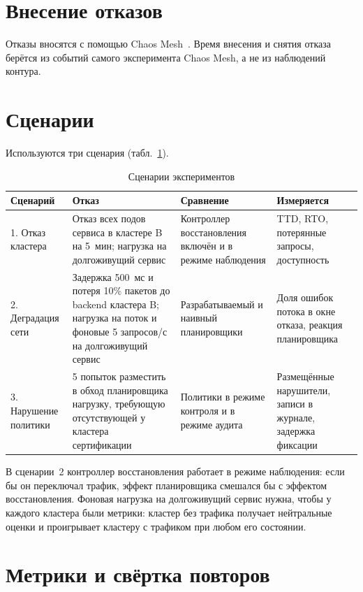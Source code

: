 \section{Внесение отказов}

Отказы вносятся с помощью Chaos Mesh~\cite{chaos-mesh}. Время внесения и
снятия отказа берётся из событий самого эксперимента Chaos Mesh, а не из
наблюдений контура.

\section{Сценарии}

Используются три сценария (табл.~\ref{tab:scenarios}).

\begin{table}[ht]
  \centering
  \caption{Сценарии экспериментов}
  \label{tab:scenarios}
  \small
  \begin{tabularx}{\textwidth}{@{}p{}XXX@{}}
    \toprule
    Сценарий & Отказ & Сравнение & Измеряется \\
    \midrule
    1. Отказ кластера & Отказ всех подов сервиса в кластере B на 5~мин;
      нагрузка на долгоживущий сервис & Контроллер восстановления
      включён и в режиме наблюдения & TTD, RTO, потерянные запросы,
      доступность \\
    2. Деградация сети & Задержка 500~мс и потеря 10\% пакетов до backend
      кластера B; нагрузка на поток и фоновые 5 запросов/с на
      долгоживущий сервис & Разрабатываемый и наивный планировщики &
      Доля ошибок потока в окне отказа, реакция планировщика \\
    3. Нарушение политики & 5 попыток разместить в обход планировщика
      нагрузку, требующую отсутствующей у кластера сертификации &
      Политики в режиме контроля и в режиме аудита & Размещённые
      нарушители, записи в журнале, задержка фиксации \\
    \bottomrule
  \end{tabularx}
\end{table}

В сценарии~2 контроллер восстановления работает в режиме наблюдения: если бы
он переключал трафик, эффект планировщика смешался бы с эффектом
восстановления. Фоновая нагрузка на долгоживущий сервис нужна, чтобы у
каждого кластера были метрики: кластер без трафика получает нейтральные
оценки и проигрывает кластеру с трафиком при любом его состоянии.

\section{Метрики и свёртка повторов}

